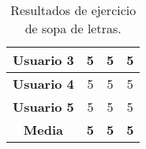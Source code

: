 \begin{table}[H]
{\begin{tabular}{l|ccc|}
            \multicolumn{1}{|l|}{\textbf{Usuario 3}} & \multicolumn{1}{c|}{5}                                                                                                                                          & \multicolumn{1}{c|}{5}                                                                                                                                                                 & 5                                                                                                                                                                                                        \\ \hline
            \multicolumn{1}{|l|}{\textbf{Usuario 4}} & \multicolumn{1}{c|}{5}                                                                                                                                          & \multicolumn{1}{c|}{5}                                                                                                                                                                 & 5                                                                                                                                                                                                        \\ \hline
            \multicolumn{1}{|l|}{\textbf{Usuario 5}} & \multicolumn{1}{c|}{5}                                                                                                                                          & \multicolumn{1}{c|}{5}                                                                                                                                                                 & 5                                                                                                                                                                                                        \\ \hline
            \multicolumn{1}{|c|}{\textbf{Media}}     & \multicolumn{1}{c|}{\textbf{5}}                                                                                                                                 & \multicolumn{1}{c|}{\textbf{5}}                                                                                                                                                        & \textbf{5}                                                                                                                                                                                               \\ \hline
        \end{tabular}
    }
    \caption{Resultados de ejercicio de sopa de letras.}
    \label{tab:resultadosSopaLetras}
\end{table}

